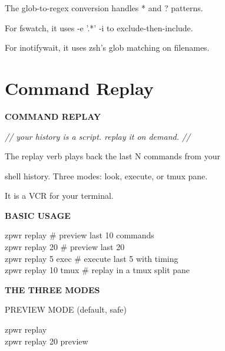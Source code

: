 \documentclass[11pt,a4paper,twoside]{book}
\begin{document}
The glob-to-regex conversion handles * and ? patterns.

For fswatch, it uses -e '.*' -i to exclude-then-include.

For inotifywait, it uses zsh's glob matching on filenames.


\vspace{16pt}

\section{Command Replay}


\vspace{10pt}
{\large\bfseries\color{neoncyan} COMMAND REPLAY}\vspace{6pt}

{\small\itshape\color{dimtext} // your history is a script. replay it on demand. //}

The replay verb plays back the last N commands from your

\begin{codebox}
shell history. Three modes: look, execute, or tmux pane.\\
\end{codebox}

It is a VCR for your terminal.


\vspace{12pt}
{\bfseries\color{neonyellow} BASIC USAGE}\vspace{4pt}

\begin{codebox}
zpwr replay                         \# preview last 10 commands\\
zpwr replay 20                      \# preview last 20\\
zpwr replay 5 exec                  \# execute last 5 with timing\\
zpwr replay 10 tmux                 \# replay in a tmux split pane\\
\end{codebox}


\vspace{12pt}
{\bfseries\color{neonyellow} THE THREE MODES}\vspace{4pt}

PREVIEW MODE (default, safe)

\begin{codebox}
zpwr replay\\
zpwr replay 20 preview\\
\end{codebox}
\end{document}
